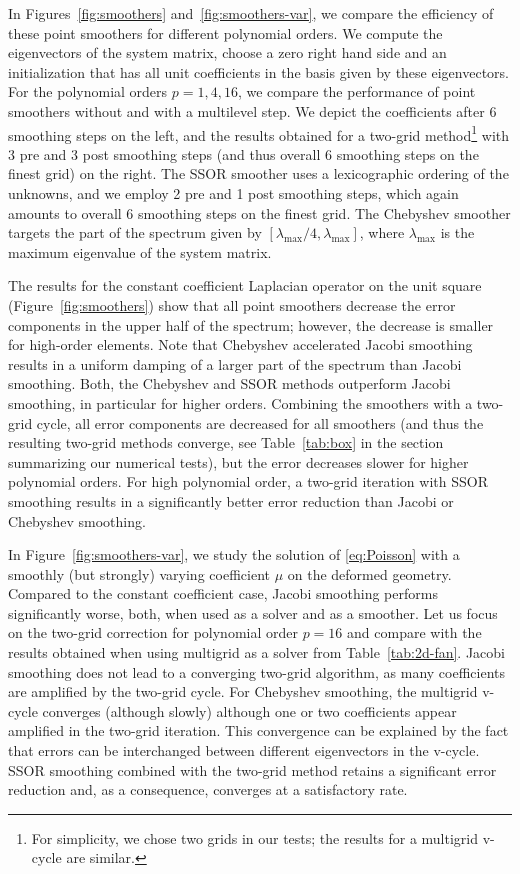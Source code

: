 \documentclass[smallcondensed,final]{svjour3}     %
\begin{document}
In Figures~\ref{fig:smoothers} and~\ref{fig:smoothers-var}, we compare
the efficiency of these point smoothers for different polynomial
orders. We compute the eigenvectors of the system matrix, choose a
zero right hand side and an initialization that has all unit
coefficients in the basis given by these eigenvectors. For the
polynomial orders $p=1,4,16$, we compare the performance of point
smoothers without and with a multilevel step.  We depict the
coefficients after 6 smoothing steps on the left, and the results
obtained for a two-grid method\footnote{For simplicity, we chose two
  grids in our tests; the results for a multigrid v-cycle are
  similar.} with 3 pre and 3 post smoothing steps (and thus overall 6
smoothing steps on the finest grid) on the right. The SSOR smoother
uses a lexicographic ordering of the unknowns, and we employ 2 pre and 1
post smoothing steps, which again amounts to overall 6 smoothing steps
on the finest grid. The Chebyshev smoother targets the part of the
spectrum given by $[\lambda_\text{max}/4,\lambda_\text{max}]$, where
$\lambda_\text{max}$ is the maximum eigenvalue of the system matrix.

The results for the constant coefficient Laplacian operator on the
unit square (Figure~\ref{fig:smoothers}) show that all point
smoothers decrease the error components in the upper half of the
spectrum; however,  the decrease is smaller for high-order
elements. Note that Chebyshev accelerated Jacobi smoothing results in
a uniform damping of a larger part of the spectrum than Jacobi
smoothing.  Both, the Chebyshev and SSOR methods outperform Jacobi
smoothing, in particular for higher orders. Combining the smoothers
with a two-grid cycle, all error components are decreased for all
smoothers (and thus the resulting two-grid methods converge, see
Table~\ref{tab:box} in the section summarizing our numerical tests),
but the error decreases slower for higher polynomial orders. For high
polynomial order, a two-grid iteration with SSOR smoothing results in a
significantly better error reduction than Jacobi or Chebyshev
smoothing.

In Figure~\ref{fig:smoothers-var}, we study the solution of
\eqref{eq:Poisson} with a smoothly (but strongly) varying coefficient
$\mu$ on the deformed geometry. Compared to the constant coefficient
case, Jacobi smoothing performs significantly worse, both, when used
as a solver and as a smoother. Let us focus on the two-grid correction
for polynomial order $p=16$ and compare with the results obtained when
using multigrid as a solver from Table~\ref{tab:2d-fan}.  Jacobi
smoothing does not lead to a converging two-grid algorithm, as many
coefficients are amplified by the two-grid cycle. For Chebyshev
smoothing, the multigrid v-cycle converges (although slowly) although
one or two coefficients appear amplified in the two-grid
iteration. This convergence can be explained by the fact that errors
can be interchanged between different eigenvectors in the v-cycle.
SSOR smoothing combined with the two-grid method retains a significant
error reduction and, as a consequence, converges at a satisfactory
rate.
\end{document}
